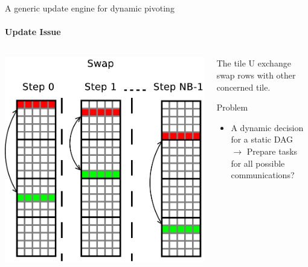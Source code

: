 
\begin{frame}{A generic update engine for dynamic pivoting}
\framesubtitle{Update Issue}
\begin{columns}
\begin{column}{.50\textwidth}
\begin{center}
\includegraphics[scale=0.3]{update_swap.pdf}
\end{center}
\end{column}
\hfill
\begin{column}{.50\textwidth}
The tile U exchange swap rows with other concerned tile.
\pause
\begin{exampleblock}{Problem}
\begin{itemize}
\item A dynamic decision for a static DAG \\
$\rightarrow$ Prepare tasks for all possible communications?
\end{itemize}
\end{exampleblock}{}
\end{column}
\end{columns}
\end{frame}

